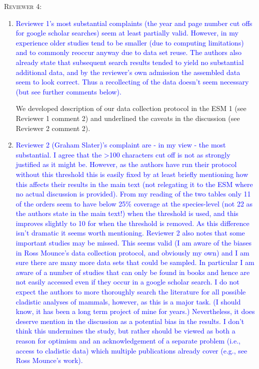 \documentclass[12pt,letterpaper]{article}
\renewcommand{\section}[1]{%
\bigskip
\begin{center}
\begin{Large}
\normalfont\scshape #1
\medskip
\end{Large}
\end{center}}
\begin{document}
\section{Reviewer 4:}
\begin{enumerate}
\item{\textcolor{blue}{Reviewer 1's most substantial complaints (the year and page number cut offs for google scholar searches) seem at least partially valid.
However, in my experience older studies tend to be smaller (due to computing limitations) and to commonly reoccur anyway due to data set reuse.
The authors also already state that subsequent search results tended to yield no substantial additional data, and by the reviewer's own admission the assembled data seem to look correct.
Thus a recollecting of the data doesn't seem necessary (but see further comments below).}}

We developed description of our data collection protocol in the ESM 1 (see Reviewer 1 comment 2) and underlined the caveats in the discussion (see Reviewer 2 comment 2).

\item{\textcolor{blue}{Reviewer 2 (Graham Slater)'s complaint are - in my view - the most substantial.
I agree that the >100 characters cut off is not as strongly justified as it might be.
However, as the authors have run their protocol without this threshold this is easily fixed by at least briefly mentioning how this affects their results in the main text (not relegating it to the ESM where no actual discussion is provided).
From my reading of the two tables only 11 of the orders seem to have below 25\% coverage at the species-level (not 22 as the authors state in the main text!) when the threshold is used, and this improves slightly to 10 for when the threshold is removed.
As this difference isn't dramatic it seems worth mentioning.
Reviewer 2 also notes that some important studies may be missed.
This seems valid (I am aware of the biases in Ross Mounce's data collection protocol, and obviously my own) and I am sure there are many more data sets that could be sampled.
In particular I am aware of a number of studies that can only be found in books and hence are not easily accessed even if they occur in a google scholar search.
I do not expect the authors to more thoroughly search the literature for all possible cladistic analyses of mammals, however, as this is a major task.
(I should know, it has been a long term project of mine for years.)
Nevertheless, it does deserve mention in the discussion as a potential bias in the results.
I don't think this undermines the study, but rather should be viewed as both a reason for optimism and an acknowledgement of a separate problem (i.e., access to cladistic data) which multiple publications already cover (e.g., see Ross Mounce's work).}}


\end{enumerate}
\end{document}
